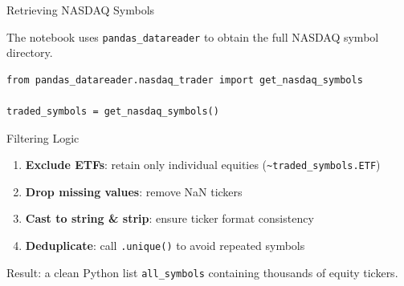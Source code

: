 \documentclass[aspectratio=169]{beamer}
\begin{document}
\begin{frame}[fragile]{Retrieving NASDAQ Symbols}

The notebook uses \texttt{pandas\_datareader} to obtain the full NASDAQ symbol directory.

\begin{lstlisting}
from pandas_datareader.nasdaq_trader import get_nasdaq_symbols

traded_symbols = get_nasdaq_symbols()
\end{lstlisting}

\vspace{0.3cm}

\begin{block}{Filtering Logic}
\begin{enumerate}
  \item \textbf{Exclude ETFs}: retain only individual equities (\texttt{\textasciitilde traded\_symbols.ETF})
  \item \textbf{Drop missing values}: remove NaN tickers
  \item \textbf{Cast to string \& strip}: ensure ticker format consistency
  \item \textbf{Deduplicate}: call \texttt{.unique()} to avoid repeated symbols
\end{enumerate}
\end{block}

Result: a clean Python list \texttt{all\_symbols} containing thousands of equity tickers.

\end{frame}
%
%
\end{document}
